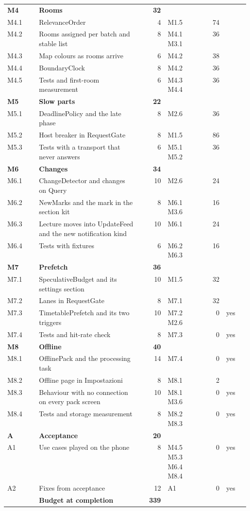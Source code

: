 \begin{longtable}{@{}l p{0.42\linewidth} r p{0.16\linewidth} r l@{}}
\midrule \textbf{M4} & \textbf{Rooms} & \textbf{32} & & & \\
M4.1 & RelevanceOrder & 4 & M1.5 & 74 &  \\
M4.2 & Rooms assigned per batch and stable list & 8 & M4.1 M3.1 & 36 &  \\
M4.3 & Map colours as rooms arrive & 6 & M4.2 & 38 &  \\
M4.4 & BoundaryClock & 8 & M4.2 & 36 &  \\
M4.5 & Tests and first-room measurement & 6 & M4.3 M4.4 & 36 &  \\
\midrule \textbf{M5} & \textbf{Slow parts} & \textbf{22} & & & \\
M5.1 & DeadlinePolicy and the late phase & 8 & M2.6 & 36 &  \\
M5.2 & Host breaker in RequestGate & 8 & M1.5 & 86 &  \\
M5.3 & Tests with a transport that never answers & 6 & M5.1 M5.2 & 36 &  \\
\midrule \textbf{M6} & \textbf{Changes} & \textbf{34} & & & \\
M6.1 & ChangeDetector and changes on Query & 10 & M2.6 & 24 &  \\
M6.2 & NewMarks and the mark in the section kit & 8 & M6.1 M3.6 & 16 &  \\
M6.3 & Lecture moves into UpdateFeed and the new notification kind & 10 & M6.1 & 24 &  \\
M6.4 & Tests with fixtures & 6 & M6.2 M6.3 & 16 &  \\
\midrule \textbf{M7} & \textbf{Prefetch} & \textbf{36} & & & \\
M7.1 & SpeculativeBudget and its settings section & 10 & M1.5 & 32 &  \\
M7.2 & Lanes in RequestGate & 8 & M7.1 & 32 &  \\
M7.3 & TimetablePrefetch and its two triggers & 10 & M7.2 M2.6 & 0 & yes \\
M7.4 & Tests and hit-rate check & 8 & M7.3 & 0 & yes \\
\midrule \textbf{M8} & \textbf{Offline} & \textbf{40} & & & \\
M8.1 & OfflinePack and the processing task & 14 & M7.4 & 0 & yes \\
M8.2 & Offline page in Impostazioni & 8 & M8.1 & 2 &  \\
M8.3 & Behaviour with no connection on every pack screen & 10 & M8.1 M3.6 & 0 & yes \\
M8.4 & Tests and storage measurement & 8 & M8.2 M8.3 & 0 & yes \\
\midrule \textbf{A} & \textbf{Acceptance} & \textbf{20} & & & \\
A1 & Use cases played on the phone & 8 & M4.5 M5.3 M6.4 M8.4 & 0 & yes \\
A2 & Fixes from acceptance & 12 & A1 & 0 & yes \\
\midrule & \textbf{Budget at completion} & \textbf{339} & & & \\
\bottomrule
\end{longtable}
